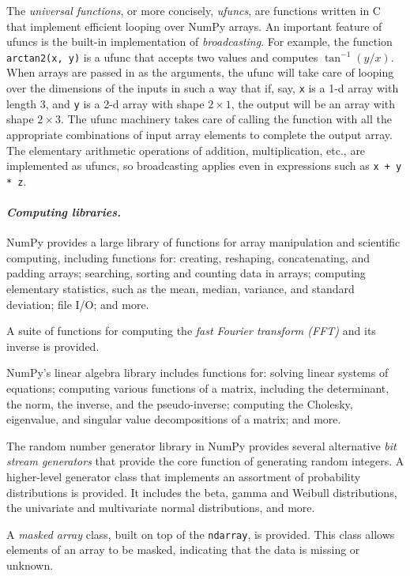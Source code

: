 \documentclass[fleqn,10pt]{wlscirep}
\newcommand{\code}[1]{\texttt{#1}}
\begin{document}
The \emph{universal functions}, or more concisely, \emph{ufuncs},
are functions written in C that implement efficient looping over
NumPy arrays. An important feature of ufuncs is the built-in
implementation of \emph{broadcasting}.  For example, the function
\code{arctan2(x, y)} is a ufunc that accepts two values and computes
$\tan^{-1}(y/x)$.  When arrays are passed in as the arguments,
the ufunc will take care of looping over the dimensions of the inputs
in such a way that if, say, \code{x} is a 1-d array with length 3, and
\code{y} is a 2-d array with shape $2 \times 1$, the output will be
an array with shape $2 \times 3$.  The ufunc machinery takes care
of calling the function with all the appropriate combinations of
input array elements to complete the output array.
The elementary arithmetic operations of addition, multiplication, etc.,
are implemented as ufuncs, so broadcasting applies even in expressions
such as \code{x + y * z}.

\paragraph{\emph{Computing libraries.}}
NumPy provides a large library of functions for array manipulation
and scientific computing, including functions for: creating, reshaping,
concatenating, and padding arrays; searching, sorting and counting data
in arrays; computing elementary statistics, such as the mean, median,
variance, and standard deviation; file I/O; and more.

A suite of functions for computing the \emph{fast Fourier transform (FFT)}
and its inverse is provided.

NumPy's linear algebra library includes functions for: solving linear
systems of equations; computing various functions of a matrix, including
the determinant, the norm, the inverse, and the pseudo-inverse;
computing the Cholesky, eigenvalue, and singular value decompositions of a matrix;
and more.

The random number generator library in NumPy provides several alternative
\emph{bit stream generators} that provide the core function of generating
random integers.
A higher-level generator class that implements an assortment of
probability distributions is provided. It includes the beta, gamma
and Weibull distributions, the univariate and multivariate normal
distributions, and more.

A \emph{masked array} class, built on top of the \code{ndarray}, is
provided.  This class allows elements of an array to be masked,
indicating that the data is missing or unknown.
\end{document}
